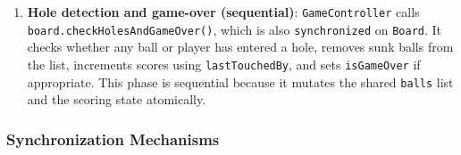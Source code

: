 \documentclass[12pt,a4paper]{article}
\begin{document}
\begin{enumerate}
	\item \textbf{Hole detection and game-over (sequential)}: \texttt{GameController} calls\\
\texttt{board.checkHolesAndGameOver()}, which is also \texttt{synchronized} on \texttt{Board}. It checks whether any ball or player has entered a hole, removes sunk balls from the list, increments scores using \texttt{lastTouchedBy}, and sets \texttt{isGameOver} if appropriate. This phase is sequential because it mutates the shared \texttt{balls} list and the scoring state atomically.
 
\end{enumerate}
 
\subsubsection{Synchronization Mechanisms}
 
\end{document}
